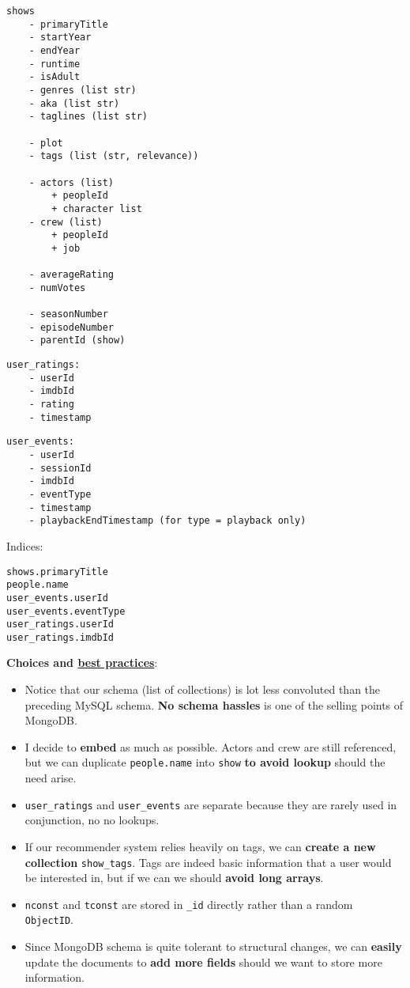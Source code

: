 \documentclass[10pt,titlepage]{article}
\begin{document}
\begin{lstlisting}
shows
    - primaryTitle
    - startYear
    - endYear
    - runtime
    - isAdult
    - genres (list str)
    - aka (list str)
    - taglines (list str)

    - plot
    - tags (list (str, relevance))

    - actors (list)
        + peopleId
        + character list
    - crew (list)
        + peopleId
        + job

    - averageRating
    - numVotes

    - seasonNumber
    - episodeNumber
    - parentId (show)
\end{lstlisting}
\begin{lstlisting}
user_ratings:
    - userId
    - imdbId
    - rating
    - timestamp
\end{lstlisting}

\begin{lstlisting}
user_events:
    - userId
    - sessionId
    - imdbId
    - eventType
    - timestamp
    - playbackEndTimestamp (for type = playback only)
\end{lstlisting}

Indices:
\begin{lstlisting}
shows.primaryTitle
people.name
user_events.userId
user_events.eventType
user_ratings.userId
user_ratings.imdbId
\end{lstlisting}

\pagebreak
\textbf{Choices and \href{https://www.mongodb.com/developer/products/mongodb/mongodb-schema-design-best-practices/}{best
practices}}:
\begin{itemize}
    \item Notice that our schema (list of collections) is lot less convoluted than the preceding MySQL schema.
        \textbf{No schema hassles} is one of the selling points of MongoDB.
    \item I decide to \textbf{embed} as much as possible. Actors and crew are still referenced, but we can duplicate
        \texttt{people.name} into \texttt{show} \textbf{to avoid lookup} should the need arise.
    \item \texttt{user\_ratings} and \texttt{user\_events} are separate because they are rarely used in conjunction, no
        no lookups.
    \item If our recommender system relies heavily on tags, we can \textbf{create a new collection} \texttt{show\_tags}.
        Tags are indeed basic information that a user would be interested in, but if we can we should \textbf{avoid long
        arrays}.
    \item \texttt{nconst} and \texttt{tconst} are stored in \texttt{\_id} directly rather than a random \texttt{ObjectID}.
    \item Since MongoDB schema is quite tolerant to structural changes, we can \textbf{easily} update the documents to
        \textbf{add more fields} should we want to store more information.
\end{itemize}
\end{document}
